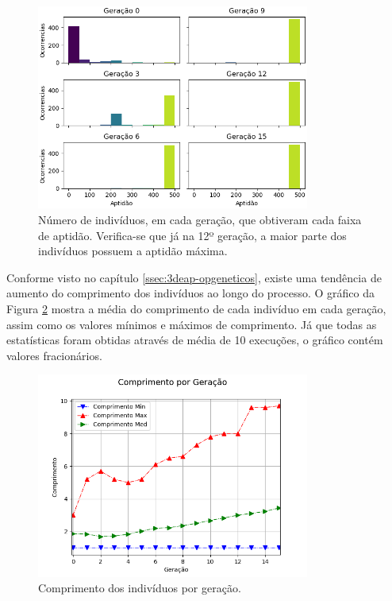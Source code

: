 \begin{figure}[H]
	\centering
	\includegraphics[width=0.8\textwidth]{02_desenvolvimento/04_EC_Fig_CartpoleAptHist.png}
	\caption{Número de indivíduos, em cada geração, que obtiveram cada faixa de aptidão. Verifica-se que já na 12º geração, a maior parte dos indivíduos possuem a aptidão máxima.}
	\label{fig:4ec-cartpoleapthist}
\end{figure}

Conforme visto no capítulo \ref{ssec:3deap-opgeneticos}, existe uma tendência de aumento do comprimento dos indivíduos ao longo do processo. O gráfico da Figura \ref{fig:4ec-cartpolecompr} mostra a média do comprimento de cada indivíduo em cada geração, assim como os valores mínimos e máximos de comprimento. Já que todas as estatísticas foram obtidas através de média de 10 execuções, o gráfico contém valores fracionários. 

\begin{figure}[H]
	\centering
	\includegraphics[width=0.8\textwidth]{02_desenvolvimento/04_EC_Fig_CartpoleCompr.png}
	\caption{Comprimento dos indivíduos por geração.}
	\label{fig:4ec-cartpolecompr}
\end{figure}

